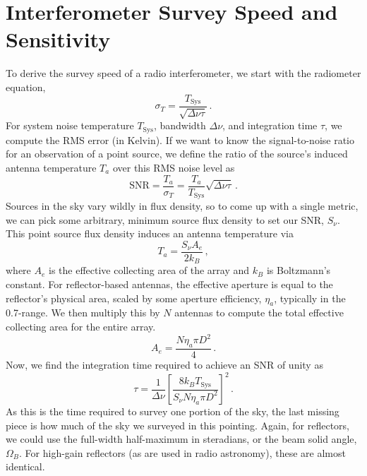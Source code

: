 \section{Interferometer Survey Speed and Sensitivity} \label{sec:survey_speed}

To derive the survey speed of a radio interferometer, we start with the radiometer equation,
\begin{equation}
    \sigma_T = \frac{T_\text{Sys}}{\sqrt{\Delta\nu\tau}}\,.
\end{equation}
For system noise temperature $T_\text{Sys}$, bandwidth $\Delta\nu$, and integration time $\tau$, we compute the RMS error (in Kelvin).
If we want to know the signal-to-noise ratio for an observation of a point source, we define the ratio of the source's induced antenna temperature $T_a$ over this RMS noise level as
\begin{equation}
    \text{SNR} = \frac{T_a}{\sigma_T} = \frac{T_a}{T_\text{Sys}}\sqrt{\Delta\nu\tau}\,.
    \label{eq:radiometer_snr}
\end{equation}
Sources in the sky vary wildly in flux density, so to come up with a single metric, we can pick some arbitrary, minimum source flux density to set our SNR, $S_\nu$.
This point source flux density induces an antenna temperature via
\begin{equation}
    T_a = \frac{S_\nu A_e}{2k_B}\,,
\end{equation}
where $A_e$ is the effective collecting area of the array and $k_B$ is Boltzmann's constant.
For reflector-based antennas, the effective aperture is equal to the reflector's physical area, scaled by some aperture efficiency, $\eta_a$, typically in the \num{0.7}-range.
We then multiply this by $N$ antennas to compute the total effective collecting area for the entire array.
\begin{equation}
    A_e = \frac{N\eta_a\pi D^2}{4}\,.
\end{equation}
Now, we find the integration time required to achieve an SNR of unity as
\begin{equation}
    \tau = \frac{1}{\Delta\nu}\left[\frac{8k_B T_\text{Sys}}{S_\nu N\eta_a\pi D^2}\right]^2\,.
    \label{eq:integration_time}
\end{equation}
As this is the time required to survey one portion of the sky, the last missing piece is how much of the sky we surveyed in this pointing.
Again, for reflectors, we could use the full-width half-maximum in steradians, or the beam solid angle, $\Omega_B$.
For high-gain reflectors (as are used in radio astronomy), these are almost identical.
